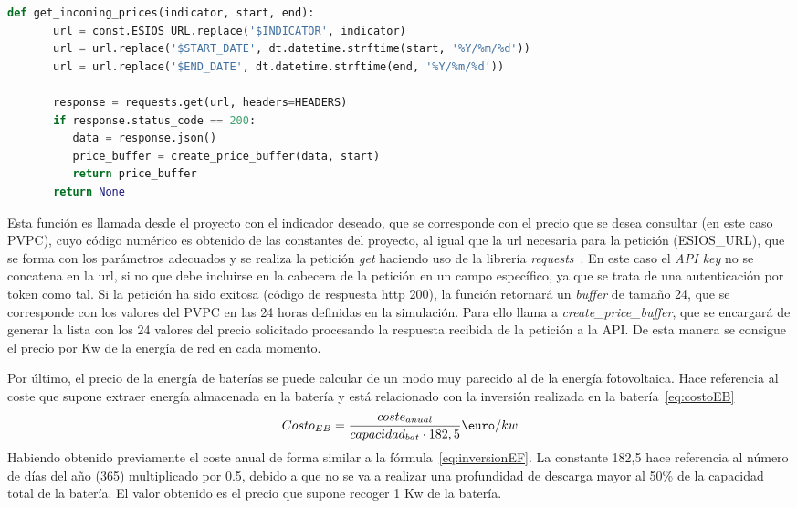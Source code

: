 	\begin{lstlisting}[language=Python,float=ht,caption={Función para obtener los valores del precio eléctrico},label={lst:esios}]
	def get_incoming_prices(indicator, start, end):
	   url = const.ESIOS_URL.replace('$INDICATOR', indicator)
	   url = url.replace('$START_DATE', dt.datetime.strftime(start, '%Y/%m/%d'))
	   url = url.replace('$END_DATE', dt.datetime.strftime(end, '%Y/%m/%d'))

	   response = requests.get(url, headers=HEADERS)
	   if response.status_code == 200:
	      data = response.json()
	      price_buffer = create_price_buffer(data, start)
	      return price_buffer
	   return None
	\end{lstlisting}

	Esta función es llamada desde el proyecto con el indicador deseado, que se corresponde con el precio que se desea consultar (en este caso PVPC), cuyo código numérico es obtenido de las constantes del proyecto, al igual que la url necesaria para la petición (ESIOS\_URL), que se forma con los parámetros adecuados y se realiza la petición \textit{get} haciendo uso de la librería \textit{requests}~\cite{Kenn11}. En este caso el \textit{API key} no se concatena en la url, si no que debe incluirse en la cabecera de la petición en un campo específico, ya que se trata de una autenticación por token como tal. Si la petición ha sido exitosa (código de respuesta http 200), la función retornará un \textit{buffer} de tamaño 24, que se corresponde con los valores del PVPC en las 24 horas definidas en la simulación. Para ello llama a \textit{create\_price\_buffer}, que se encargará de generar la lista con los 24 valores del precio solicitado procesando la respuesta recibida de la petición a la API.
	De esta manera se consigue el precio por Kw de la energía de red en cada momento.

	Por último, el precio de la energía de baterías se puede calcular de un modo muy parecido al de la energía fotovoltaica. Hace referencia al coste que supone extraer energía almacenada en la batería y está relacionado con la inversión realizada en la batería~\ref{eq:costoEB}
	\begin{equation}
          \label{eq:costoEB}
	Costo_{EB} = \frac{coste_{anual}}{capacidad_{bat}\cdot182,5} \textup{\euro}/kw
	\end{equation}
	Habiendo obtenido previamente el coste anual de forma similar a la fórmula~\ref{eq:inversionEF}. La constante 182,5 hace referencia al número de días del año (365) multiplicado por 0.5, debido a que no se va a realizar una profundidad de descarga mayor al 50\% de la capacidad total de la batería. El valor obtenido es el precio que supone recoger 1 Kw de la batería.
